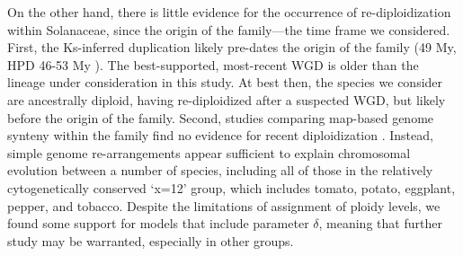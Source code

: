 On the other hand, there is little evidence for the occurrence of re-diploidization within Solanaceae, since the origin of the family---the time frame we considered.
First, the Ks-inferred duplication likely pre-dates the origin of the family (49 My, HPD 46-53 My \citealt{sarkinen_2013}). 
The best-supported, most-recent WGD \citet{tomato2012} is older than the lineage under consideration in this study.
At best then, the species we consider are ancestrally diploid, having re-diploidized after a suspected WGD, but likely before the origin of the family.
Second, studies comparing map-based genome synteny within the family find no evidence for recent diploidization \citep{wu_2010a}.
Instead, simple genome re-arrangements appear sufficient to explain chromosomal evolution between a number of species, including all of those in the relatively cytogenetically conserved `x=12' group, which includes tomato, potato, eggplant, pepper, and tobacco.
Despite the limitations of assignment of ploidy levels, we found some support for models that include parameter $\delta$, meaning that further study may be warranted, especially in other groups.

